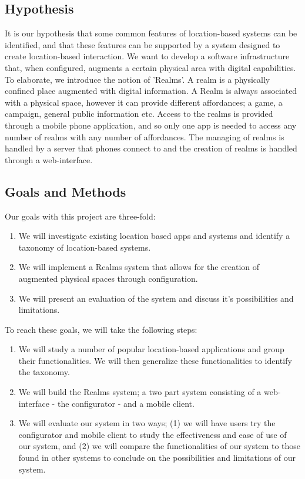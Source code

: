 
\subsection{Hypothesis} %
\label{sub:hypothesis}
It is our hypothesis that some common features of location-based systems can be identified, and that these features can be supported by a system designed to create location-based interaction. We want to develop a software infrastructure that, when configured, augments a certain physical area with digital capabilities. To elaborate, we introduce the notion of 'Realms'. A realm is a physically confined place augmented with digital information. A Realm is always associated with a physical space, however it can provide different affordances; a game, a campaign, general public information etc. Access to the realms is provided through a mobile phone application, and so only one app is needed to access any number of realms with any number of affordances. The managing of realms is handled by a server that phones connect to and the creation of realms is handled through a web-interface. 

\subsection{Goals and Methods} %
\label{sub:goals_and_methods}
Our goals with this project are three-fold:
\begin{enumerate}
	\item We will investigate existing location based apps and systems and identify a taxonomy of location-based systems.
	\item We will implement a Realms system that allows for the creation of augmented physical spaces through configuration. 
	\item We will present an evaluation of the system and discuss it's possibilities and limitations.
\end{enumerate}

\noindent To reach these goals, we will take the following steps:

\begin{enumerate}
	\item We will study a number of popular location-based applications and group their functionalities. We will then generalize these functionalities to identify the taxonomy.
	\item We will build the Realms system; a two part system consisting of a web-interface - the configurator - and a mobile client.
	\item We will evaluate our system in two ways; (1) we will have users try the configurator and mobile client to study the effectiveness and ease of use of our system, and (2) we will compare the functionalities of our system to those found in other systems to conclude on the possibilities and limitations of our system.
\end{enumerate}

